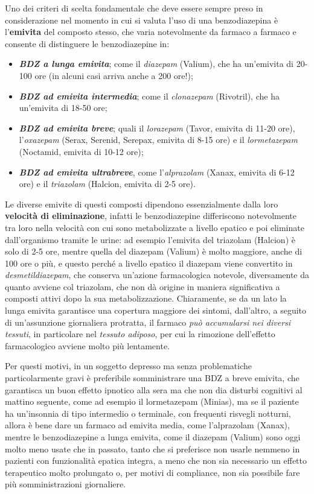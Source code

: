 \documentclass[]{article}
\begin{document}
Uno dei criteri di scelta fondamentale che deve essere sempre preso in
considerazione nel momento in cui si valuta l'uso di una benzodiazepina
è l'\textbf{emivita} del composto stesso, che varia notevolmente da
farmaco a farmaco e consente di distinguere le benzodiazepine in:

\begin{itemize}
\item
  \textbf{\emph{BDZ a lunga emivita}}; come il \emph{diazepam} (Valium),
  che ha un'emivita di 20-100 ore (in alcuni casi arriva anche a 200
  ore!);
\item
  \textbf{\emph{BDZ ad emivita intermedia}}; come il \emph{clonazepam}
  (Rivotril), che ha un'emivita di 18-50 ore;
\item
  \textbf{\emph{BDZ ad emivita breve}}; quali il \emph{lorazepam}
  (Tavor, emivita di 11-20 ore), l'\emph{oxazepam} (Serax, Serenid,
  Serepax, emivita di 8-15 ore) e il \emph{lormetazepam} (Noctamid,
  emivita di 10-12 ore);
\item
  \textbf{\emph{BDZ ad emivita ultrabreve}}, come l'\emph{alprazolam}
  (Xanax, emivita di 6-12 ore) e il \emph{triazolam} (Halcion, emivita
  di 2-5 ore).
\end{itemize}

Le diverse emivite di questi composti dipendono essenzialmente dalla
loro \textbf{velocità di eliminazione}, infatti le benzodiazepine
differiscono notevolmente tra loro nella velocità con cui sono
metabolizzate a livello epatico e poi eliminate dall'organismo tramite
le urine: ad esempio l'emivita del triazolam (Halcion) è solo di 2-5
ore, mentre quella del diazepam (Valium) è molto maggiore, anche di 100
ore o più, e questo perché a livello epatico il diazepam viene
convertito in \emph{desmetildiazepam}, che conserva un'azione
farmacologica notevole, diversamente da quanto avviene col triazolam,
che non dà origine in maniera significativa a composti attivi dopo la
sua metabolizzazione. Chiaramente, se da un lato la lunga emivita
garantisce una copertura maggiore dei sintomi, dall'altro, a seguito di
un'assunzione giornaliera protratta, il farmaco \emph{può accumularsi
nei diversi tessuti}, in particolare nel \emph{tessuto adiposo}, per cui
la rimozione dell'effetto farmacologico avviene molto più lentamente.

Per questi motivi, in un soggetto depresso ma senza problematiche
particolarmente gravi è preferibile somministrare una BDZ a breve
emivita, che garantisca un buon effetto ipnotico alla sera ma che non
dia disturbi cognitivi al mattino seguente, come ad esempio il
lormetazepam (Minias), ma se il paziente ha un'insonnia di tipo
intermedio o terminale, con frequenti risvegli notturni, allora è bene
dare un farmaco ad emivita media, come l'alprazolam (Xanax), mentre le
benzodiazepine a lunga emivita, come il diazepam (Valium) sono oggi
molto meno usate che in passato, tanto che si preferisce non usarle
nemmeno in pazienti con funzionalità epatica integra, a meno che non sia
necessario un effetto terapeutico molto prolungato o, per motivi di
compliance, non sia possibile fare più somministrazioni giornaliere.
\end{document}
